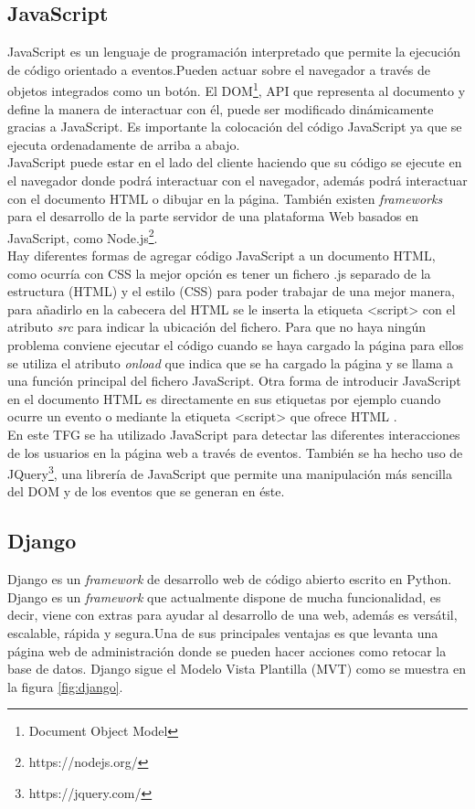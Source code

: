 \subsection{JavaScript}
JavaScript es un lenguaje de programación interpretado que permite la ejecución de código orientado a eventos.Pueden actuar sobre el navegador a través de objetos integrados como un botón. El DOM\footnote{Document Object Model}, API que representa al documento y define la manera de interactuar con él, puede ser modificado dinámicamente gracias a JavaScript. Es importante la colocación del código JavaScript ya que se ejecuta ordenadamente de arriba a abajo. \\

JavaScript puede estar en el lado del cliente haciendo que su código se ejecute en el navegador donde podrá interactuar con el navegador, además podrá interactuar con el documento HTML o dibujar en la página. También existen \textit{frameworks} para el desarrollo de la parte servidor de una plataforma Web basados en JavaScript, como Node.js\footnote{https://nodejs.org/}.\cite{juan4}\\

Hay diferentes formas de agregar código JavaScript a un documento HTML, como ocurría con CSS la mejor opción es tener un fichero .js separado de la estructura (HTML) y el estilo (CSS) para poder trabajar de una mejor manera, para añadirlo en la cabecera del HTML se le inserta la etiqueta {\textless script\textgreater} con el atributo \textit{src} para indicar la ubicación del fichero. Para que no haya ningún problema conviene ejecutar el código cuando se haya cargado la página para ellos se utiliza el atributo \textit{onload} que indica que se ha cargado la página y se llama a una función principal del fichero JavaScript. Otra forma de introducir JavaScript en el documento HTML es directamente en sus etiquetas por ejemplo cuando ocurre un evento o mediante la etiqueta {\textless script\textgreater} que ofrece HTML .\cite{js}\\

En este TFG se ha utilizado JavaScript para detectar las diferentes interacciones de los usuarios en la página web a través de eventos. También se ha hecho uso de JQuery\footnote{https://jquery.com/}, una librería de JavaScript que permite una manipulación más sencilla del DOM y de los eventos que se generan en éste. 

\subsection{Django}
Django es un \textit{framework} de desarrollo web de código abierto escrito en Python. Django es un \textit{framework} que actualmente dispone de mucha funcionalidad, es decir, viene con extras para ayudar al desarrollo de una web, además es versátil, escalable, rápida y segura.Una de sus principales ventajas es que  levanta una página web de administración donde se pueden hacer acciones como retocar la base de datos. Django sigue el Modelo Vista Plantilla (MVT) como se muestra en la figura \ref{fig:django}.\\

